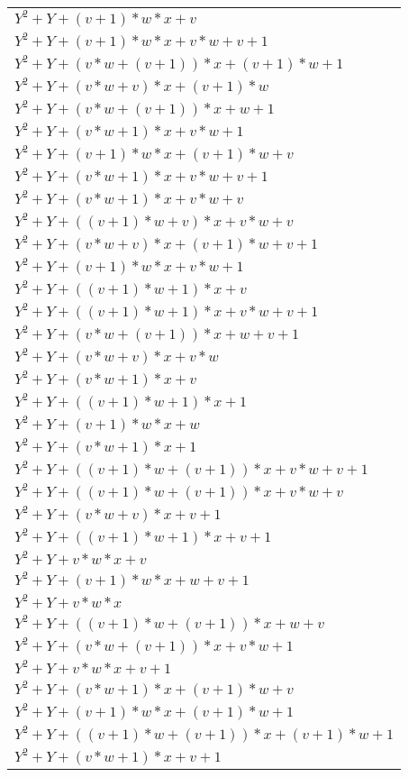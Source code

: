 \documentclass[12pt]{article}
\begin{document}
\begin{adjustwidth}{-2cm}{}
\begin{center}
\begin{longtable}{|l|}
	$Y^2 + Y + (v + 1)*w*x + v$ \\
	$Y^2 + Y + (v + 1)*w*x + v*w + v + 1$ \\
	$Y^2 + Y + (v*w + (v + 1))*x + (v + 1)*w + 1$ \\
	$Y^2 + Y + (v*w + v)*x + (v + 1)*w$ \\
	$Y^2 + Y + (v*w + (v + 1))*x + w + 1$ \\
	$Y^2 + Y + (v*w + 1)*x + v*w + 1$ \\
	$Y^2 + Y + (v + 1)*w*x + (v + 1)*w + v$ \\
	$Y^2 + Y + (v*w + 1)*x + v*w + v + 1$ \\
	$Y^2 + Y + (v*w + 1)*x + v*w + v$ \\
	$Y^2 + Y + ((v + 1)*w + v)*x + v*w + v$ \\
	$Y^2 + Y + (v*w + v)*x + (v + 1)*w + v + 1$ \\
	$Y^2 + Y + (v + 1)*w*x + v*w + 1$ \\
	$Y^2 + Y + ((v + 1)*w + 1)*x + v$ \\
	$Y^2 + Y + ((v + 1)*w + 1)*x + v*w + v + 1$ \\
	$Y^2 + Y + (v*w + (v + 1))*x + w + v + 1$ \\
	$Y^2 + Y + (v*w + v)*x + v*w$ \\
	$Y^2 + Y + (v*w + 1)*x + v$ \\
	$Y^2 + Y + ((v + 1)*w + 1)*x + 1$ \\
	$Y^2 + Y + (v + 1)*w*x + w$ \\
	$Y^2 + Y + (v*w + 1)*x + 1$ \\
	$Y^2 + Y + ((v + 1)*w + (v + 1))*x + v*w + v + 1$ \\
	$Y^2 + Y + ((v + 1)*w + (v + 1))*x + v*w + v$ \\
	$Y^2 + Y + (v*w + v)*x + v + 1$ \\
	$Y^2 + Y + ((v + 1)*w + 1)*x + v + 1$ \\
	$Y^2 + Y + v*w*x + v$ \\
	$Y^2 + Y + (v + 1)*w*x + w + v + 1$ \\
	$Y^2 + Y + v*w*x$ \\
	$Y^2 + Y + ((v + 1)*w + (v + 1))*x + w + v$ \\
	$Y^2 + Y + (v*w + (v + 1))*x + v*w + 1$ \\
	$Y^2 + Y + v*w*x + v + 1$ \\
	$Y^2 + Y + (v*w + 1)*x + (v + 1)*w + v$ \\
	$Y^2 + Y + (v + 1)*w*x + (v + 1)*w + 1$ \\
	$Y^2 + Y + ((v + 1)*w + (v + 1))*x + (v + 1)*w + 1$ \\
	$Y^2 + Y + (v*w + 1)*x + v + 1$ \\
\hline
\end{longtable}
\end{center}
\end{adjustwidth}
\end{document}
